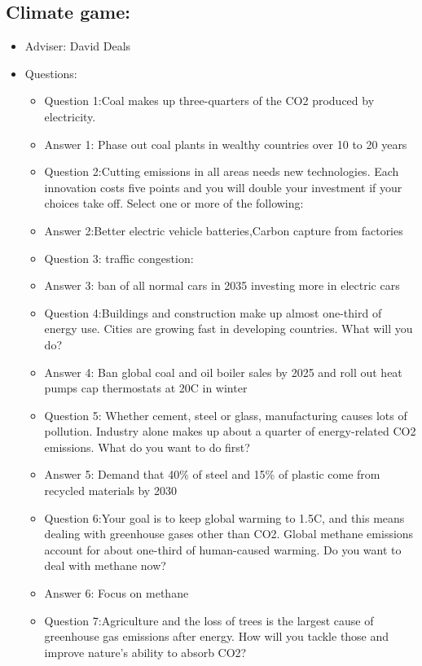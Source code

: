 \documentclass[12pt]{article}
\begin{document}
\subsection{Climate game:}
\begin{itemize}
    \item Adviser: David Deals
    \item Questions:\begin{itemize}
        \item Question 1:Coal makes up three-quarters of the CO2 produced by electricity.
        \item Answer 1: Phase out coal plants in wealthy countries over 10 to 20 years
        \item Question 2:Cutting emissions in all areas needs new technologies. Each innovation costs five points and you will double your investment if your choices take off. Select one or more of the following:
        \item Answer 2:Better electric vehicle batteries,Carbon capture from factories
        \item Question 3: traffic congestion:
        \item Answer 3: ban of all normal cars in 2035 investing more in electric cars
        \item Question 4:Buildings and construction make up almost one-third of energy use. Cities are growing fast in developing countries. What will you do?
        \item Answer 4: Ban global coal and oil boiler sales by 2025 and roll out heat pumps cap thermostats at 20C in winter
        \item Question 5: Whether cement, steel or glass, manufacturing causes lots of pollution. Industry alone makes up about a quarter of energy-related CO2 emissions. What do you want to do first?
        \item Answer 5: Demand that 40\% of steel and 15\% of plastic come from recycled materials by 2030
        \item Question 6:Your goal is to keep global warming to 1.5C, and this means dealing with greenhouse gases other than CO2. Global methane emissions account for about one-third of human-caused warming. Do you want to deal with methane now?
        \item Answer 6: Focus on methane
        \item Question 7:Agriculture and the loss of trees is the largest cause of greenhouse gas emissions after energy. How will you tackle those and improve nature's ability to absorb CO2?

\end{itemize}
\end{itemize}
\end{document}
